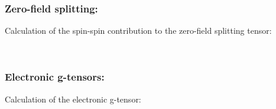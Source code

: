 \subsubsection{Zero-field splitting: }

Calculation of the spin-spin contribution to the zero-field splitting
tensor:

\begin{description}
  \item{} \\
\end{description}

\subsubsection{Electronic g-tensors:  }
\label{sec:g-tensor}
Calculation of the electronic g-tensor:

